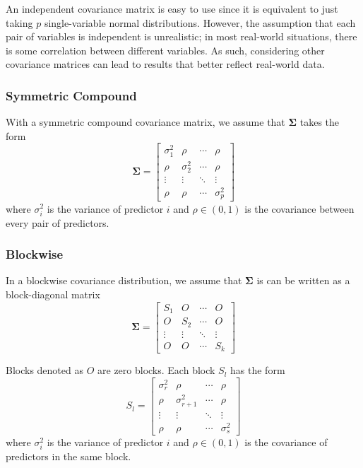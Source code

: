 \documentclass{article}
\begin{document}
An independent covariance matrix is easy to use since it is equivalent to just taking $p$ single-variable normal distributions. However, the assumption that each pair of variables is independent is unrealistic; in most real-world situations, there is some correlation between different variables. As such, considering other covariance matrices can lead to results that better reflect real-world data.

\subsubsection{Symmetric Compound}
With a symmetric compound covariance matrix, we assume that $\mathbf{\Sigma}$ takes the form
\begin{equation}
	\mathbf{\Sigma} = \begin{bmatrix}
		\sigma_1^2 & \rho & \cdots & \rho\\
		\rho & \sigma_2^2 & \cdots & \rho\\
		\vdots & \vdots & \ddots & \vdots\\
		\rho & \rho & \cdots & \sigma_p^2
	\end{bmatrix}
\end{equation}
where $\sigma_i^2$ is the variance of predictor $i$ and $\rho \in (0, 1)$ is the covariance between every pair of predictors.

\subsubsection{Blockwise}
In a blockwise covariance distribution, we assume that $\mathbf{\Sigma}$ is can be written as a block-diagonal matrix
\begin{equation}
	\mathbf{\Sigma} = \begin{bmatrix}
		S_1 & O & \cdots & O\\
		O & S_2 & \cdots & O\\
		\vdots & \vdots & \ddots & \vdots\\
		O & O & \cdots & S_k
	\end{bmatrix}
\end{equation}

Blocks denoted as $O$ are zero blocks. Each block $S_l$ has the form
\begin{equation}
	S_l = \begin{bmatrix}
		\sigma_{r}^2 & \rho & \cdots & \rho\\
		\rho & \sigma_{r + 1}^2 & \cdots & \rho\\
		\vdots & \vdots & \ddots & \vdots\\
		\rho & \rho & \cdots & \sigma_{s}^2
	\end{bmatrix}	
\end{equation}
where $\sigma_i^2$ is the variance of predictor $i$ and $\rho\in (0, 1)$ is the covariance of predictors in the same block.
\end{document}
